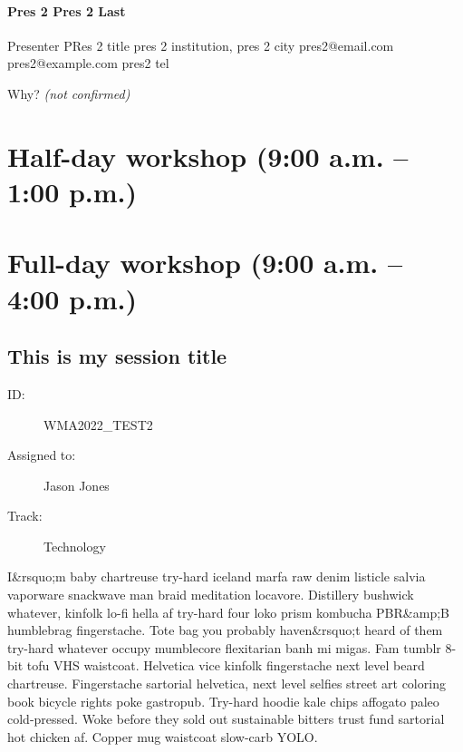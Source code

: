 \documentclass{report}
\begin{document}
              
                \subsubsection*{ Pres 2 Pres 2 Last }
                Presenter\newline
                PRes 2 title\newline
                pres 2 institution, pres 2 city
                \newline
                pres2@email.com\newline
                pres2@example.com\newline
                pres2 tel\newline

                Why?
                \emph{ (not confirmed) }
              

              

              
        
    \newpage
    \chapter*{ Half-day workshop (9:00 a.m. – 1:00 p.m.) }

      
        
        
    \newpage
    \chapter*{ Full-day workshop (9:00 a.m. – 4:00 p.m.) }

      
        
        
        
          \newpage
          \section{ This is my session title }
            \begin{description}
              \item [ID:]
              WMA2022\_TEST2

              \item [Assigned to:]Jason Jones~
                \item [Track:]Technology~
              \end{description}

              I\&rsquo;m baby chartreuse try-hard iceland marfa raw denim listicle salvia vaporware snackwave man braid meditation locavore. Distillery bushwick whatever, kinfolk lo-fi hella af try-hard four loko prism kombucha PBR\&amp;B humblebrag fingerstache. Tote bag you probably haven\&rsquo;t heard of them try-hard whatever occupy mumblecore flexitarian banh mi migas. Fam tumblr 8-bit tofu VHS waistcoat.
Helvetica vice kinfolk fingerstache next level beard chartreuse. Fingerstache sartorial helvetica, next level selfies street art coloring book bicycle rights poke gastropub. Try-hard hoodie kale chips affogato paleo cold-pressed. Woke before they sold out sustainable bitters trust fund sartorial hot chicken af. Copper mug waistcoat slow-carb YOLO.
\end{document}
